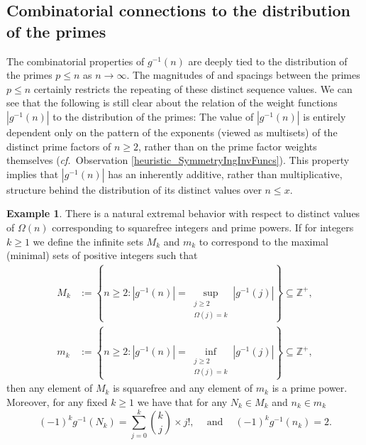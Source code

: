 \documentclass[11pt,reqno,a4letter]{article}
\numberwithin{figure}{section}
\numberwithin{table}{section}
\newcommand{\cf}{\textit{cf.\ }}
\theoremstyle{plain}
\numberwithin{theorem}{section}
\theoremstyle{definition}
\newtheorem{example}[theorem]{Example}
\begin{document}
\subsection{Combinatorial connections to the distribution of the primes} 
\label{subSection_AConnectionToDistOfThePrimes} 

The combinatorial properties of $g^{-1}(n)$ are deeply tied to the distribution of the primes 
$p \leq n$ as $n \rightarrow \infty$. 
The magnitudes of and spacings between the primes $p \leq n$ certainly restricts the 
repeating of these distinct sequence values. 
We can see that the following 
is still clear about the relation of the weight functions $|g^{-1}(n)|$ to the 
distribution of the primes: 
The value of $|g^{-1}(n)|$ is entirely dependent only on the pattern of the exponents 
(viewed as multisets) of the distinct prime factors of $n \geq 2$, rather than on the 
prime factor weights themselves 
(\cf Observation \ref{heuristic_SymmetryIngInvFuncs}). 
This property implies that $|g^{-1}(n)|$ has an inherently additive, rather than 
multiplicative, structure behind the distribution of its distinct values over $n \leq x$. 

\begin{example} 
There is a natural extremal behavior with respect to distinct values of $\Omega(n)$ 
corresponding to squarefree integers and prime powers. If for integers 
$k \geq 1$ we define the 
infinite sets $M_k$ and $m_k$ to correspond to the maximal (minimal) sets of 
positive integers such that 
\begin{align*} 
M_k & := \left\{n \geq 2: |g^{-1}(n)| = \underset{{\substack{j \geq 2 \\ \Omega(j) = k}}}{\operatorname{sup}} 
     |g^{-1}(j)|\right\} \subseteq \mathbb{Z}^{+}, \\  
m_k & := \left\{n \geq 2: |g^{-1}(n)| = \underset{{\substack{j \geq 2 \\ \Omega(j) = k}}}{\operatorname{inf}} 
     |g^{-1}(j)|\right\} \subseteq \mathbb{Z}^{+}, 
\end{align*} 
then any element of $M_k$ is squarefree and any element of $m_k$ is a prime power. 
Moreover, for any fixed $k \geq 1$ 
we have that for any $N_k \in M_k$ and $n_k \in m_k$
\[
(-1)^{k} g^{-1}(N_k) = \sum_{j=0}^{k} \binom{k}{j} \times j!, 
     \quad \mathrm{\ and\ } \quad 
     (-1)^{k} g^{-1}(n_k) = 2. 
\]
\end{example}
\end{document}
